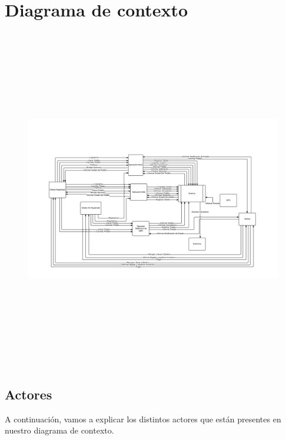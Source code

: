 \documentclass[a4paper, 10pt, twoside]{article}
\begin{document}

\section{Diagrama de contexto}

  \begin{figure}[H]
    \includegraphics[height=15cm,angle=90]{diagramas/contexto.png}
  \end{figure}

\subsection{Actores}

A continuación, vamos a explicar los distintos actores que están presentes en nuestro diagrama de contexto.
\end{document}
